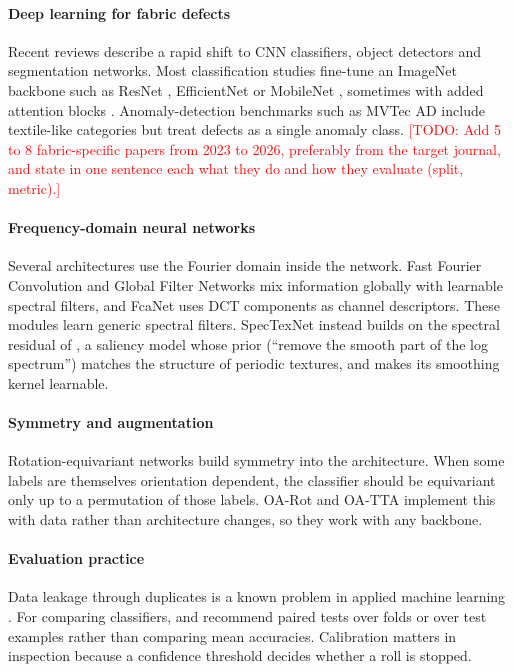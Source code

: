 \documentclass[preprint,12pt,authoryear]{elsarticle}
\newcommand{\todo}[1]{\textcolor{red}{[TODO: #1]}}
\begin{document}
\paragraph{Deep learning for fabric defects}
Recent reviews \citep{kahraman2023review,carrilho2024survey,li2021survey} describe a rapid shift to
CNN classifiers, object detectors and segmentation networks. Most classification studies fine-tune
an ImageNet backbone such as ResNet \citep{he2016resnet}, EfficientNet \citep{tan2019efficientnet}
or MobileNet \citep{howard2019mobilenetv3}, sometimes with added attention blocks
\citep{hu2018se,woo2018cbam}. Anomaly-detection benchmarks such as MVTec AD
\citep{bergmann2019mvtec} include textile-like categories but treat defects as a single anomaly
class. \todo{Add 5 to 8 fabric-specific papers from 2023 to 2026, preferably from the target
journal, and state in one sentence each what they do and how they evaluate (split, metric).}

\paragraph{Frequency-domain neural networks}
Several architectures use the Fourier domain inside the network. Fast Fourier Convolution
\citep{chi2020ffc} and Global Filter Networks \citep{rao2021gfnet} mix information globally with
learnable spectral filters, and FcaNet \citep{qin2021fcanet} uses DCT components as channel
descriptors. These modules learn generic spectral filters. SpecTexNet instead builds on the
spectral residual of \citet{hou2007spectral}, a saliency model whose prior (``remove the smooth
part of the log spectrum'') matches the structure of periodic textures, and makes its smoothing
kernel learnable.

\paragraph{Symmetry and augmentation}
Rotation-equivariant networks \citep{cohen2016gcnn} build symmetry into the architecture. When some
labels are themselves orientation dependent, the classifier should be equivariant only up to a
permutation of those labels. OA-Rot and OA-TTA implement this with data rather than architecture
changes, so they work with any backbone.

\paragraph{Evaluation practice}
Data leakage through duplicates is a known problem in applied machine learning
\citep{kaufman2012leakage}. For comparing classifiers, \citet{dietterich1998} and
\citet{demsar2006} recommend paired tests over folds or over test examples rather than comparing
mean accuracies. Calibration \citep{guo2017calibration} matters in inspection because a confidence
threshold decides whether a roll is stopped.
\end{document}
